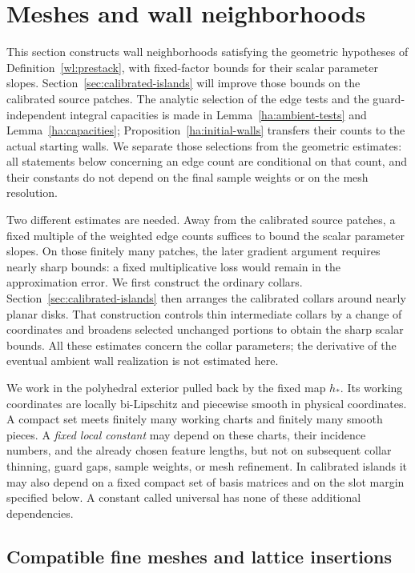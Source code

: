 \section{Meshes and wall neighborhoods}
\label{sec:mesh}

This section constructs wall neighborhoods satisfying the geometric
hypotheses of Definition~\ref{wl:prestack}, with fixed-factor bounds
for their scalar parameter slopes.  Section~\ref{sec:calibrated-islands}
will improve those bounds on the calibrated source patches.
The analytic selection of the edge tests and the
guard-independent integral capacities is made in
Lemma~\ref{ha:ambient-tests} and Lemma~\ref{ha:capacities};
Proposition~\ref{ha:initial-walls} transfers their counts to the actual
starting walls.  We separate those
selections from the geometric estimates: all statements below concerning
an edge count are conditional on that count, and their constants do not
depend on the final sample weights or on the mesh resolution.

Two different estimates are needed.  Away from the calibrated source
patches, a fixed multiple of the weighted edge counts suffices to bound
the scalar parameter slopes.  On those finitely many patches, the
later gradient argument requires nearly sharp bounds: a fixed
multiplicative loss would remain in the approximation error.  We first
construct the ordinary collars.  Section~\ref{sec:calibrated-islands}
then arranges the calibrated collars around nearly planar disks.
That construction controls thin
intermediate collars by a change of coordinates and broadens selected
unchanged portions to obtain the sharp scalar bounds.  All these
estimates concern the collar parameters; the derivative of the eventual
ambient wall realization is not estimated here.

We work in the polyhedral exterior pulled back by the fixed map $h_*$.
Its working coordinates are locally bi-Lipschitz and piecewise smooth
in physical coordinates.  A compact set meets finitely many working
charts and finitely many smooth pieces.  A \emph{fixed local constant}
may depend on these charts, their incidence numbers, and the already
chosen feature lengths, but not on subsequent collar thinning, guard
gaps, sample weights, or mesh refinement.  In calibrated islands it may
also depend on a fixed compact set of basis matrices and on the slot
margin specified below.  A constant called universal has none of these
additional dependencies.

\subsection{Compatible fine meshes and lattice insertions}

